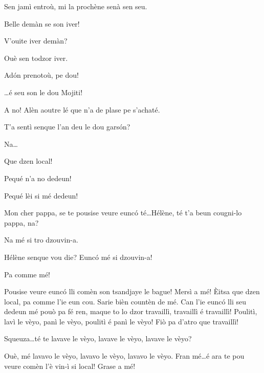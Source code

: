 \begin{drama}
\Louisspeaks Sen jamì entroù, mi la prochène senà sen seu.

\Pierrespeaks Belle demàn se son iver!

\Louisspeaks{} V'ouite iver demàn?

\Bertaspeaks Ouè sen todzor iver.

\Pierrespeaks Ad\'on prenotoù, pe dou!


\Helenespeaks \ldots é seu son le dou Mojiti!


\Pierrespeaks A no! Alèn aoutre lé que n'a de plase pe s'achaté.


\Bertaspeaks{} T'a sentì senque l'an deu le dou gars\'on?

\Helenespeaks Na\ldots

\Bertaspeaks{} \og Que dzen local\fg!

\Helenespeaks{} Pequé n'a no dedeun!

\Bertaspeaks{} Pequé lèi si mé dedeun!


\Bertaspeaks Mon cher pappa, se te pousise veure eunc\'o té\ldots Hélène, té t'a beun cougni-lo pappa, na?

\Helenespeaks Na mé si tro dzouvin-a.

\Bertaspeaks Hélène senque vou die? Eunc\'o mé si dzouvin-a!

\Helenespeaks Pa comme mé!

\Bertaspeaks{} Pousise veure eunc\'o lli comèn son tsandjaye le bague! Mersì a mé! \`Eitsa que dzen local, pa comme l'ie eun cou. Sarie bièn countèn de mé. Can l'ie eunc\'o lli seu dedeun mé pouò pa fé ren, maque to lo dzor travaillì, travaillì é travaillì! Poulitì, lavì le vèyo, panì le vèyo, poulitì é panì le vèyo! Fiò pa d'atro que travaillì!

\Helenespeaks{} Squeuza\ldots té te lavave le vèyo, lavave le vèyo, lavave le vèyo?

\Bertaspeaks Ouè, mé lavavo le vèyo, lavavo le vèyo, lavavo le vèyo. Fran mé\ldots é ara te pou veure comèn l'è vin-ì si local! Grase a mé!


\end{drama}
